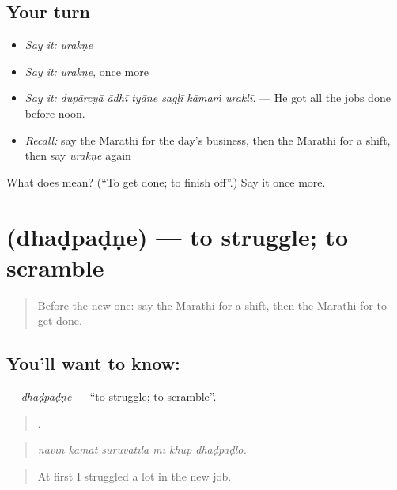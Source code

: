 \subsection*{Your turn}
\begin{itemize}
\raggedright
  \item \emph{Say it:} \emph{urakṇe}
  \item \emph{Say it:} \emph{urakṇe}, once more
  \item \emph{Say it:} \emph{dupārcyā ādhī tyāne sagḷī kāmaṁ uraklī.} — He got all the jobs done before noon.
  \item \emph{Recall:} say the Marathi for the day's business, then the Marathi for a shift, then say \emph{urakṇe} again
\end{itemize}

\begin{tcolorbox}[breakable,colback=teal!4,colframe=teal!35!black,title={Before you move on}]
What does  mean? (\textquotedblleft{}To get done; to finish off\textquotedblright{}.) Say it once more.
\end{tcolorbox}
\section[\texorpdfstring{\mr{धडपडणे} (dhaḍpaḍṇe)}{धडपडणे (dhaḍpaḍṇe)}]{ (dhaḍpaḍṇe) — to struggle; to scramble}

\label{lesson:MR-C514-dhadpadne}



\begin{quote}
Before the new one: say the Marathi for a shift, then the Marathi for to get done.
\end{quote}

\subsection*{You'll want to know: }
\textbf{} — \emph{dhaḍpaḍṇe} — \textquotedblleft{}to struggle; to scramble\textquotedblright{}.

\begin{quote}
     .
\end{quote}

\begin{quote}
\emph{navīn kāmāt suruvātīlā mī khūp dhaḍpaḍlo.}
\end{quote}

\begin{quote}
At first I struggled a lot in the new job.
\end{quote}

